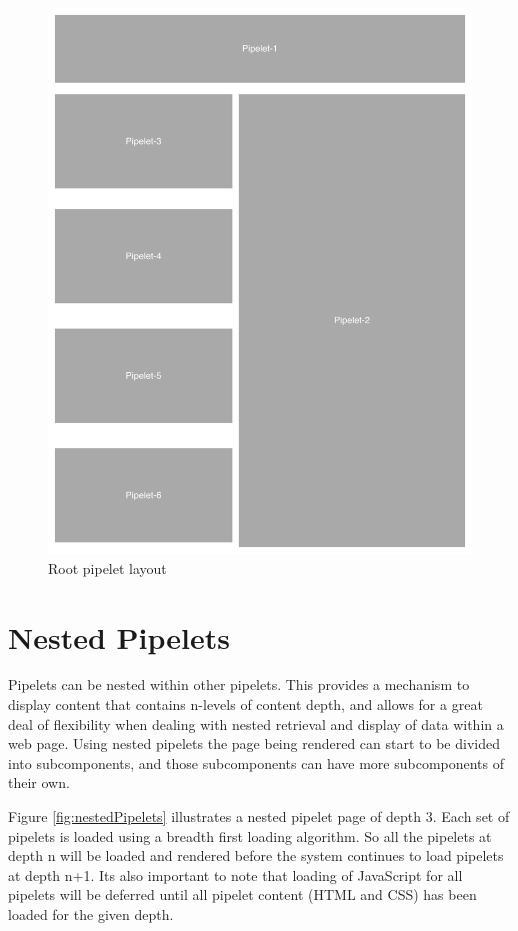 \documentclass[12pt]{report}
\begin{document}
\begin{figure}[H]
\label{fig:rootPipeletLayout}
\centering
\includegraphics[width=\textwidth,keepaspectratio]{figures/images/root_pipelet.pdf}
\caption{Root pipelet layout}
\end{figure}

	
\section{Nested Pipelets}
Pipelets can be nested within other pipelets. This provides a mechanism to display content that contains n-levels of content depth, and allows for a great deal of flexibility when dealing with nested retrieval and display of data within a web page. Using nested pipelets the page being rendered can start to be divided into subcomponents, and those subcomponents can have more subcomponents of their own. 

Figure \ref{fig:nestedPipelets} illustrates a nested pipelet page of depth 3. Each set of pipelets is loaded using a breadth first loading algorithm. So all the pipelets at depth n will be loaded and rendered before the system continues to load pipelets at depth n+1. Its also important to note that loading of JavaScript for all pipelets will be deferred until all pipelet content (HTML and CSS) has been loaded for the given depth.
\end{document}
